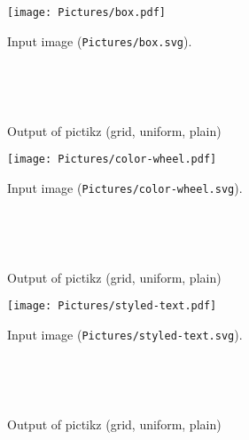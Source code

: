 \documentclass{article}
\begin{document}
\begin{figure}[H]
 \centering
 \texttt{[image: Pictures/box.pdf]}
 \caption{Input image (\texttt{Pictures/box.svg}).}
 \end{figure}

 \begin{figure}[H]
 \centering
 \begin{tikzpicture}[scale=1.5]
 
 \end{tikzpicture}~
 \begin{tikzpicture}[scale=1.5]
 
 \end{tikzpicture}~
 \begin{tikzpicture}[scale=1.5]
 
 \end{tikzpicture}
 \caption{Output of pictikz (grid, uniform, plain)}
 \end{figure}\clearpage

\begin{figure}[H]
 \centering
 \texttt{[image: Pictures/color-wheel.pdf]}
 \caption{Input image (\texttt{Pictures/color-wheel.svg}).}
 \end{figure}

 \begin{figure}[H]
 \centering
 \begin{tikzpicture}[scale=1.5]
 
 \end{tikzpicture}~
 \begin{tikzpicture}[scale=1.5]
 
 \end{tikzpicture}~
 \begin{tikzpicture}[scale=1.5]
 
 \end{tikzpicture}
 \caption{Output of pictikz (grid, uniform, plain)}
 \end{figure}\clearpage

\begin{figure}[H]
 \centering
 \texttt{[image: Pictures/styled-text.pdf]}
 \caption{Input image (\texttt{Pictures/styled-text.svg}).}
 \end{figure}

 \begin{figure}[H]
 \centering
 \begin{tikzpicture}[scale=1.5]
 
 \end{tikzpicture}~
 \begin{tikzpicture}[scale=1.5]
 
 \end{tikzpicture}~
 \begin{tikzpicture}[scale=1.5]
 
 \end{tikzpicture}
 \caption{Output of pictikz (grid, uniform, plain)}
 \end{figure}\clearpage
\end{document}

